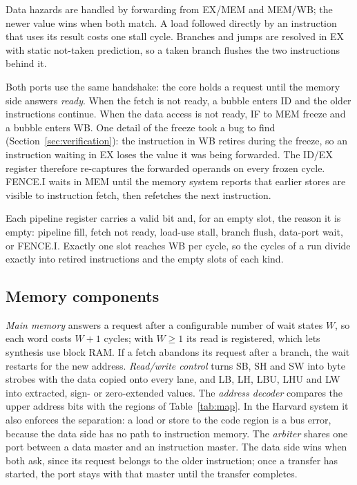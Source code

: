 \documentclass[conference]{IEEEtran}
\begin{document}
Data hazards are handled by forwarding from EX/MEM and MEM/WB; the newer value wins when both match. A load followed directly by an instruction that uses its result costs one stall cycle. Branches and jumps are resolved in EX with static not-taken prediction, so a taken branch flushes the two instructions behind it.

Both ports use the same handshake: the core holds a request until the memory side answers \emph{ready}. When the fetch is not ready, a bubble enters ID and the older instructions continue. When the data access is not ready, IF to MEM freeze and a bubble enters WB. One detail of the freeze took a bug to find (Section~\ref{sec:verification}): the instruction in WB retires during the freeze, so an instruction waiting in EX loses the value it was being forwarded. The ID/EX register therefore re-captures the forwarded operands on every frozen cycle. FENCE.I waits in MEM until the memory system reports that earlier stores are visible to instruction fetch, then refetches the next instruction.

Each pipeline register carries a valid bit and, for an empty slot, the reason it is empty: pipeline fill, fetch not ready, load-use stall, branch flush, data-port wait, or FENCE.I. Exactly one slot reaches WB per cycle, so the cycles of a run divide exactly into retired instructions and the empty slots of each kind.

\subsection{Memory components}
\emph{Main memory} answers a request after a configurable number of wait states $W$, so each word costs $W+1$ cycles; with $W \ge 1$ its read is registered, which lets synthesis use block RAM. If a fetch abandons its request after a branch, the wait restarts for the new address. \emph{Read/write control} turns SB, SH and SW into byte strobes with the data copied onto every lane, and LB, LH, LBU, LHU and LW into extracted, sign- or zero-extended values. The \emph{address decoder} compares the upper address bits with the regions of Table~\ref{tab:map}. In the Harvard system it also enforces the separation: a load or store to the code region is a bus error, because the data side has no path to instruction memory. The \emph{arbiter} shares one port between a data master and an instruction master. The data side wins when both ask, since its request belongs to the older instruction; once a transfer has started, the port stays with that master until the transfer completes.
\end{document}
